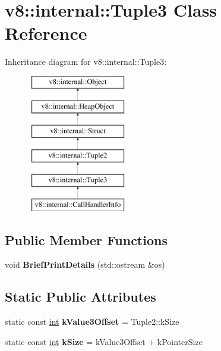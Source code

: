 \hypertarget{classv8_1_1internal_1_1Tuple3}{}\section{v8\+:\+:internal\+:\+:Tuple3 Class Reference}
\label{classv8_1_1internal_1_1Tuple3}
Inheritance diagram for v8\+:\+:internal\+:\+:Tuple3\+:\begin{figure}[H]
\begin{center}
\leavevmode
\includegraphics[height=6.000000cm]{classv8_1_1internal_1_1Tuple3}
\end{center}
\end{figure}
\subsection*{Public Member Functions}
\begin{DoxyCompactItemize}
\item 
\mbox{\label{classv8_1_1internal_1_1Tuple3_a7f5c51c8869bab81c072434511180d6b}} 
void {\bfseries Brief\+Print\+Details} (std\+::ostream \&os)
\end{DoxyCompactItemize}
\subsection*{Static Public Attributes}
\begin{DoxyCompactItemize}
\item 
\mbox{\label{classv8_1_1internal_1_1Tuple3_acecb654c86e56386ea637648dfe428fc}} 
static const \mbox{\hyperlink{classint}{int}} {\bfseries k\+Value3\+Offset} = Tuple2\+::k\+Size
\item 
\mbox{\label{classv8_1_1internal_1_1Tuple3_ab15c5d540427870ecab76c14ea06c414}} 
static const \mbox{\hyperlink{classint}{int}} {\bfseries k\+Size} = k\+Value3\+Offset + k\+Pointer\+Size
\end{DoxyCompactItemize}
